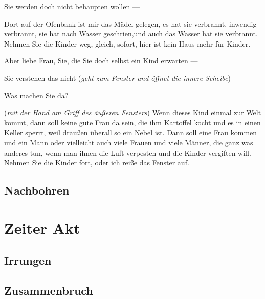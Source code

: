 \documentclass[
	final,
	a4paper,
	ngerman,
	mpinclude = true, %
	twoside = true,
	open = right,
	cleardoublepage = plain,
	DIV = 13,
	BCOR = 1cm,
	titlepage = firstiscover,
	]{scrbook}
\newcommand{\act}{\chapter}
\newcommand{\scene}{\setcounter{subscene}{1}\section}
\newcommand{\direction}[1]{(\textit{#1})}
\newcounter{subscene}
\newcommand{\thecharacter}[1]{\textup{\textsc{#1}}\xspace}
\newcommand{\theBarbara}{\thecharacter{Barbara}}
\newcommand{\character}[1]{\item[#1]}
\newcommand{\Barbara}{\character{\theBarbara}}
\newcommand{\Generaldirektor}{\character{Direktor}}
\begin{document}
\begin{play}
\Generaldirektor
Sie werden doch nicht behaupten wollen ---

\Barbara
Dort auf der Ofenbank ist mir das Mädel gelegen, es hat sie verbrannt, inwendig verbrannt, sie hat nach Wasser geschrien,und auch das Wasser hat sie verbrannt. Nehmen Sie die Kinder weg, gleich, sofort, hier ist kein Haus mehr für Kinder.

\Generaldirektor
Aber liebe Frau, Sie, die Sie doch selbst ein Kind erwarten ---

\Barbara
Sie verstehen das nicht \direction{geht zum Fenster und öffnet die innere Scheibe}

\Generaldirektor
Was machen Sie da?

\Barbara
\direction{mit der Hand am Griff des äußeren Fensters} Wenn dieses Kind einmal zur Welt kommt, dann soll keine gute Frau da sein, die ihm Kartoffel kocht und es in einen Keller sperrt, weil draußen überall so ein Nebel ist. Dann soll eine Frau kommen und ein Mann oder vielleicht auch viele Frauen und viele Männer, die ganz was anderes tun, wenn man ihnen die Luft verpesten und die Kinder vergiften will. Nehmen Sie die Kinder fort, oder ich reiße das Fenster auf.
\end{play}



\scene{Nachbohren}
\label{scene:V}

\act{Zeiter Akt}
\scene{Irrungen}
\label{scene:VI}
\scene{Zusammenbruch}
\label{scene:VII}
\end{document}
